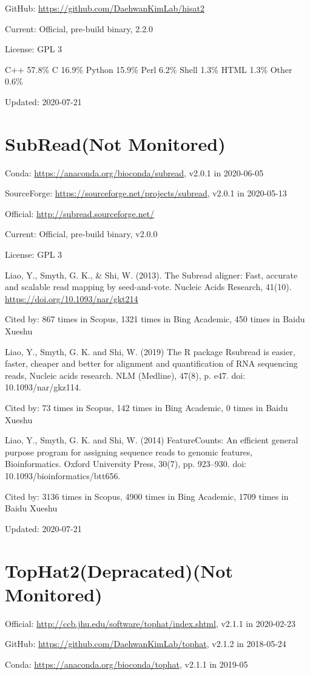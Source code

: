 \documentclass[]{article}
\newcommand{\nm}{{\color{red}(Not Monitored)}}
\newcommand{\de}{{\color{red}(Depracated)}}
\newcommand{\cb}[3]{\par Cited by: {\color{blue}\Huge #1} times in Scopus, {\color{blue}\Huge #2} times in Bing Academic, {\color{blue}\Huge #3} times in Baidu Xueshu}
\begin{document}
GitHub: \url{https://github.com/DaehwanKimLab/hisat2}

Current: Official, pre-build binary, 2.2.0

License: GPL 3

C++ 57.8\% C 16.9\% Python 15.9\% Perl 6.2\% Shell 1.3\% HTML 1.3\% Other 0.6\%

Updated: 2020-07-21

\section{SubRead\nm}

Conda: \url{https://anaconda.org/bioconda/subread}, v2.0.1 in 2020-06-05

SourceForge: \url{https://sourceforge.net/projects/subread}, v2.0.1 in 2020-05-13

Official: \url{http://subread.sourceforge.net/}

Current: Official, pre-build binary, v2.0.0

License: GPL 3

Liao, Y., Smyth, G. K., \& Shi, W. (2013). The Subread aligner: Fast, accurate and scalable read mapping by seed-and-vote. Nucleic Acids Research, 41(10). \url{https://doi.org/10.1093/nar/gkt214}\cb{867}{1321}{450}

Liao, Y., Smyth, G. K. and Shi, W. (2019) The R package Rsubread is easier, faster, cheaper and better for alignment and quantification of RNA sequencing reads, Nucleic acids research. NLM (Medline), 47(8), p. e47. doi: 10.1093/nar/gkz114.\cb{73}{142}{0}

Liao, Y., Smyth, G. K. and Shi, W. (2014) FeatureCounts: An efficient general purpose program for assigning sequence reads to genomic features, Bioinformatics. Oxford University Press, 30(7), pp. 923–930. doi: 10.1093/bioinformatics/btt656.\cb{3136}{4900}{1709}

Updated: 2020-07-21

\section{TopHat2\de\nm}

Official: \url{http://ccb.jhu.edu/software/tophat/index.shtml}, v2.1.1 in 2020-02-23

GitHub: \url{https://github.com/DaehwanKimLab/tophat}, v2.1.2 in 2018-05-24

Conda: \url{https://anaconda.org/bioconda/tophat}, v2.1.1 in 2019-05
\end{document}
